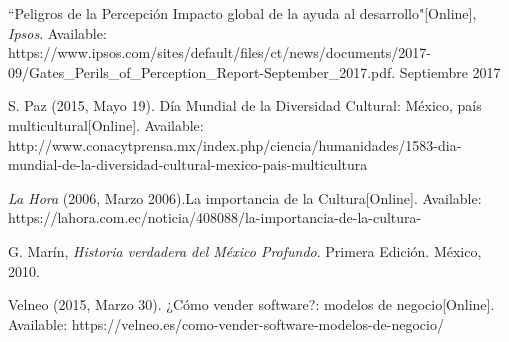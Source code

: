 \begin{thebibliography}{X}
	\textnormal{ ``Peligros de la Percepción Impacto global de la ayuda al desarrollo"[Online], \textit{Ipsos}. Available: https://www.ipsos.com/sites/default/files/ct/news/documents/2017-09/Gates\_Perils\_of\_Perception\_Report-September\_2017.pdf. Septiembre 2017 }	

	\textnormal{ S. Paz (2015, Mayo 19). Día Mundial de la Diversidad Cultural: México, país multicultural[Online]. Available: http://www.conacytprensa.mx/index.php/ciencia/humanidades/1583-dia-mundial-de-la-diversidad-cultural-mexico-pais-multicultura
	}

	\textnormal{ \textit{La Hora} (2006, Marzo 2006).La importancia de la Cultura[Online]. Available: https://lahora.com.ec/noticia/408088/la-importancia-de-la-cultura-
	}

	\textnormal{ G. Marín, \textit{Historia verdadera del México Profundo}. Primera Edición. México, 2010.
	}


	\textnormal Velneo (2015, Marzo 30). ¿Cómo vender software?: modelos de negocio[Online]. Available: https://velneo.es/como-vender-software-modelos-de-negocio/


\end{thebibliography}